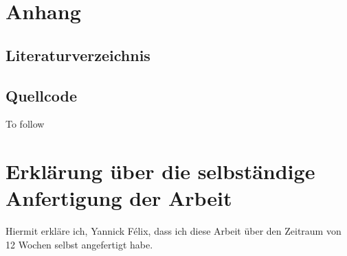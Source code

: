 \documentclass[a4paper,12pt]{scrartcl}      %
\begin{document}
	\newpage
	\section{Anhang}
	\subsection{Literaturverzeichnis}
	\printbibliography[heading=none]
	
	\subsection{Quellcode}
	To follow
	
	\newpage
	\section{Erklärung über die selbständige Anfertigung der Arbeit}
	Hiermit erkläre ich, Yannick F\'{e}lix, dass ich diese Arbeit über den Zeitraum von 12 Wochen selbst angefertigt habe.
\end{document}
